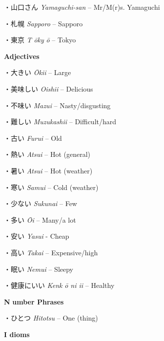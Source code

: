 \par{・山口さん \emph{Yamaguchi-san }– Mr\slash M(r)s. Yamaguchi }

\par{・札幌 \emph{Sapporo }– Sapporo }

\par{・東京 \emph{T }\emph{ōky }\emph{ō }– Tokyo }

\par{\textbf{Adjectives }}

\par{・大きい \emph{Ōkii }– Large }

\par{・美味しい \emph{Oishii }– Delicious }

\par{・不味い \emph{Mazui }– Nasty\slash disgusting }

\par{・難しい \emph{Muzukashii }– Difficult\slash hard }

\par{・古い \emph{Furui }– Old }

\par{・熱い \emph{Atsui }– Hot (general) }

\par{・暑い \emph{Atsui }– Hot (weather) }

\par{・寒い \emph{Samui }– Cold (weather) }

\par{・少ない \emph{Sukunai }– Few }

\par{・多い \emph{Ōi }– Many\slash a lot }

\par{・安い \emph{Yasui }- Cheap }

\par{・高い \emph{Takai }– Expensive\slash high }

\par{・眠い \emph{Nemui }– Sleepy }

\par{・健康にいい \emph{Kenk }\emph{ō ni ii }– Healthy }

\par{\textbf{N }\textbf{umber Phrases }}

\par{・ひとつ \emph{Hitotsu }– One (thing) }

\par{\textbf{I dioms }}

